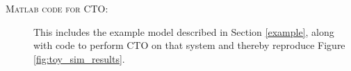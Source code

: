 \documentclass[12pt]{article}
\begin{document}
\begin{description}


\item[\scshape{Matlab} code for CTO:] This includes the example model described in Section \ref{example}, along with code to perform CTO on that system and thereby reproduce Figure \ref{fig:toy_sim_results}.


%

\end{description}




\end{document}

